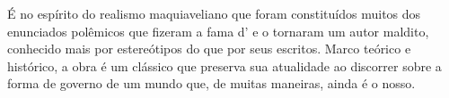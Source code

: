 É no espírito do realismo maquiaveliano que foram constituídos muitos dos enunciados polêmicos que fizeram a fama d'{} e o tornaram um autor maldito, conhecido mais por estereótipos do que por seus escritos. Marco teórico e histórico, a obra é um clássico que preserva sua atualidade ao discorrer sobre a forma de governo de um mundo que, de muitas maneiras, ainda é o nosso.


\vfill

\hspace*{-.4cm}\begin{minipage}[c]{.5\linewidth}
\small{
{}}
\end{minipage}



\pagebreak
\pagestyle{hedracat}


